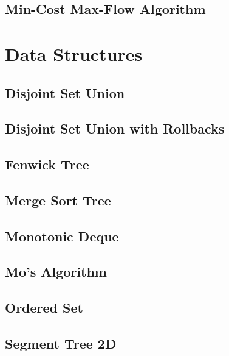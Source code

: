 \subsection{Min-Cost Max-Flow Algorithm}
\raggedbottom
\hrulefill

\section{Data Structures}
\subsection{Disjoint Set Union}
\raggedbottom
\hrulefill
\subsection{Disjoint Set Union with Rollbacks}
\raggedbottom
\hrulefill
\subsection{Fenwick Tree}
\raggedbottom
\hrulefill
\subsection{Merge Sort Tree}
\raggedbottom
\hrulefill
\subsection{Monotonic Deque}
\raggedbottom
\hrulefill
\subsection{Mo's Algorithm}
\raggedbottom
\hrulefill
\subsection{Ordered Set}
\raggedbottom
\hrulefill
\subsection{Segment Tree 2D}
\raggedbottom
\hrulefill

